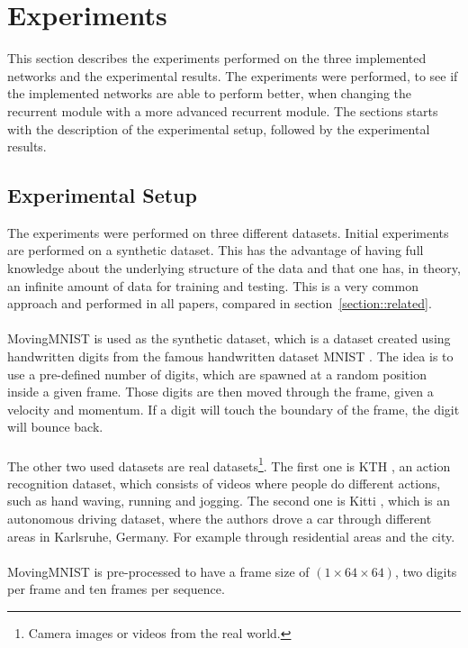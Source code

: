 \section{Experiments} \label{section::experiments}
 This section describes the experiments performed on the three implemented networks and the experimental results. The experiments were performed, to see 
 if the implemented networks are able to perform better, when changing the recurrent module with a more advanced recurrent module. The sections starts with 
 the description of the experimental setup, followed by the experimental results.
 
 \subsection{Experimental Setup} \label{subsection::exp_setup}
  The experiments were performed on three different datasets. Initial experiments are performed on a synthetic dataset. This has the advantage of having full 
  knowledge
  about the underlying structure of the data and that one has, in theory, an infinite amount of data for training and testing. This is a very common approach
  and performed in all papers, compared in section~\ref{section::related}.
  \\\\
  MovingMNIST is used as the synthetic dataset, which is a dataset created using handwritten digits from the famous handwritten dataset MNIST
  \cite{LeCun1998}. The idea is to use a pre-defined number of digits, which are spawned at a random position inside a given frame. Those digits are then moved 
  through the frame, given a velocity and momentum. If a digit will touch the boundary of the frame, the digit will bounce back.
  \\\\  
  The other two used datasets are real datasets\footnote{Camera images or videos from the real world.}.
  The first one is KTH \cite{Schuldt2004}, an action recognition dataset, which consists of videos where people
  do different actions, such as hand waving, running and jogging. The second one is Kitti \cite{Geiger2013}, which is an autonomous driving dataset, where
  the authors drove a car through different areas in Karlsruhe, Germany. For example through residential areas and the city.
  \\\\
  MovingMNIST is pre-processed to have a frame size of $(1 \times 64 \times 64)$, two digits per frame and ten frames per sequence.
